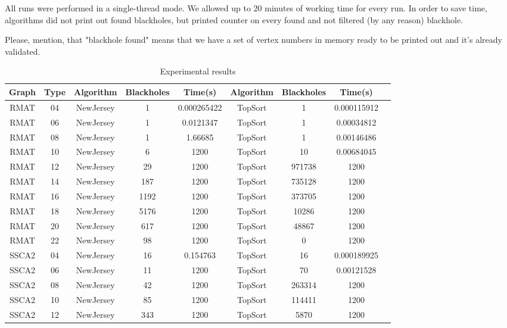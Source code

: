 \documentclass{svproc}
\begin{document}
All runs were performed in a single-thread mode. We allowed up to 20 minutes of working time for every run. In order to save time,
algorithms did not print out found blackholes, but printed counter on every found and not filtered (by any reason) blackhole.

Please, mention, that "blackhole found" means that we have a set of vertex numbers in memory ready to be printed out and it's already validated.

\begin{table}[]
\caption{Experimental results}
\label{tabular:tableresults}
\begin{center}
\begin{tabular}{c|c|c|c|c|c|c|c|c}
Graph & Type & Algorithm & Blackholes & Time(s) & Algorithm & Blackholes & Time(s) \\
\hline
RMAT & 04 & NewJersey & 1 & 0.000265422 & TopSort & 1 & 0.000115912 \\
RMAT & 06 & NewJersey & 1 & 0.0121347 & TopSort & 1 & 0.00034812 \\
RMAT & 08 & NewJersey & 1 & 1.66685 & TopSort & 1 & 0.00146486 \\
RMAT & 10 & NewJersey & 6 & 1200 & TopSort & 10 & 0.00684045 \\
RMAT & 12 & NewJersey & 29 & 1200 & TopSort & 971738 & 1200 \\
RMAT & 14 & NewJersey & 187 & 1200 & TopSort & 735128 & 1200 \\
RMAT & 16 & NewJersey & 1192 & 1200 & TopSort & 373705 & 1200 \\
RMAT & 18 & NewJersey & 5176 & 1200 & TopSort & 10286 & 1200 \\
RMAT & 20 & NewJersey & 617 & 1200 & TopSort & 48867 & 1200 \\
RMAT & 22 & NewJersey & 98 & 1200 & TopSort & 0 & 1200 \\
SSCA2 & 04 & NewJersey & 16 & 0.154763 & TopSort & 16 & 0.000189925 \\
SSCA2 & 06 & NewJersey & 11 & 1200 & TopSort & 70 & 0.00121528 \\
SSCA2 & 08 & NewJersey & 42 & 1200 & TopSort & 263314 & 1200 \\
SSCA2 & 10 & NewJersey & 85 & 1200 & TopSort & 114411 & 1200 \\
SSCA2 & 12 & NewJersey & 343 & 1200 & TopSort & 5870 & 1200 \\
\end{tabular}
\end{center}
\end{table}
\end{document}
